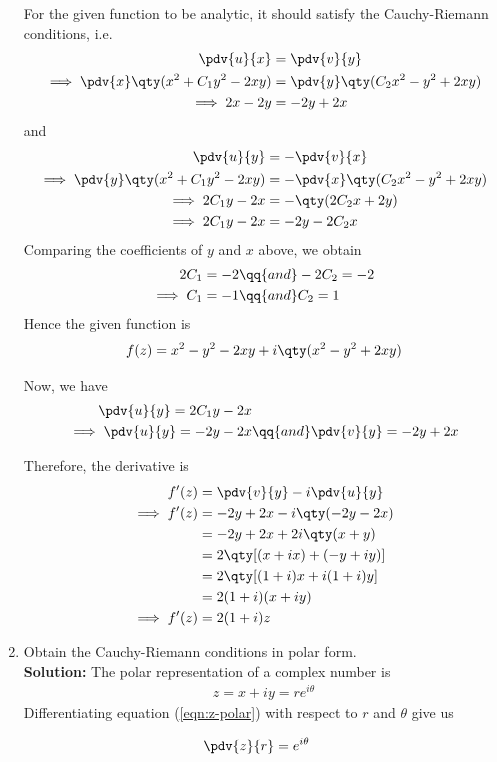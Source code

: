 \begin{enumerate}
			For the given function to be analytic, it should satisfy the Cauchy-Riemann conditions, i.e.
			\begin{align*}
				\pdv{u}{x}&=\pdv{v}{y} \\
				\implies\pdv{x}\qty(x^2+C_1y^2-2xy)&=\pdv{y}\qty(C_2x^2-y^2+2xy) \\
				\implies 2x-2y&=-2y+2x
			\end{align*}
			and
			\begin{align*}
				\pdv{u}{y}&=-\pdv{v}{x} \\
				\implies\pdv{y}\qty(x^2+C_1y^2-2xy)&=-\pdv{x}\qty(C_2x^2-y^2+2xy) \\
				\implies 2C_1y-2x&=-\qty(2C_2x+2y) \\
				\implies 2C_1y-2x&=-2y-2C_2x
			\end{align*}
			Comparing the coefficients of $y$ and $x$ above, we obtain
			\begin{align*}
				2C_1=-2&\qq{and}-2C_2=-2 \\
				\implies C_1=-1&\qq{and}C_2=1
			\end{align*}
			Hence the given function is
			\begin{align*}
				f(z)=x^2-y^2-2xy+i\qty(x^2-y^2+2xy)
			\end{align*}
			
			Now, we have
			\begin{align*}
				\pdv{u}{y}=2C_1y-2x& \\
				\implies\pdv{u}{y}=-2y-2x&\qq{and}\pdv{v}{y}=-2y+2x
			\end{align*}
			
			Therefore, the derivative is
			\begin{align*}
				f'(z)&=\pdv{v}{y}-i\pdv{u}{y} \\
				\implies f'(z)&=-2y+2x-i\qty(-2y-2x) \\
					&=-2y+2x+2i\qty(x+y) \\
					&=2\qty[(x+ix)+(-y+iy)] \\
					&=2\qty[(1+i)x+i(1+i)y] \\
					&=2(1+i)(x+iy) \\
				\implies f'(z)&=2(1+i)z
			\end{align*}
			
			\item Obtain the Cauchy-Riemann conditions in polar form.\\ 
			\textbf{Solution:} The polar representation of a complex number is
			\begin{align}
				z=x+iy=re^{i\theta} \label{eqn:z-polar}
			\end{align}
			Differentiating equation (\ref{eqn:z-polar}) with respect to $r$ and $\theta$ give us\vspace{-4ex}
			\begin{multicols}{2}
				\begin{align}
					\pdv{z}{r}&=e^{i\theta} \label{eqn:dz-dr}
				\end{align}
				

\end{multicols}
\end{enumerate}
